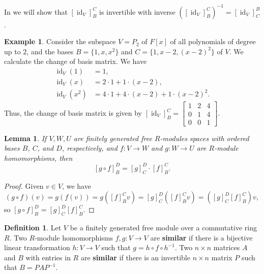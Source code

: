 \documentclass[12pt]{report}
\newtheorem{lemma}[theorem]{Lemma}
\numberwithin{equation}{section}
\numberwithin{theorem}{chapter}
\theoremstyle{definition}
\newtheorem{definition}[theorem]{Definition}
\newtheorem{example}[theorem]{Example}
\newtheorem*{basic properties}{Basic Properties}
\newtheorem*{Important Remark}{Important Remark}
\newcommand{\df}[1]{{\bf #1}\index{#1}}
\DeclareMathOperator{\id}{id}
\begin{document}
In  we will show that $[\id_V]_B^{C}$ is invertible with inverse $\left([\id_V]_B^{C}\right)^{-1}=[\id_V]_{C}^B$.

\begin{example}
Consider the subspace $V = P_2$ of $F[x]$ of all polynomials of degree up to $2$, and the bases $B = \{1, x, x^2\}$ and $C = \{1,x-2,(x-2)^2\}$ of $V$. We calculate the change of basis matrix. We have
$$\begin{aligned}
\id_V(1) &=1 ,\\
\id_V(x) &=2\cdot1+1\cdot(x-2), \\
\id_V(x^2) &=4\cdot1 +4\cdot(x-2)+1\cdot(x-2)^2.
\end{aligned}$$
Thus, the change of basis matrix is given by 
$[\id_V]_B^{C} = \begin{bmatrix}
1 & 2 & 4\\
0 & 1 & 4\\
0 & 0 & 1
\end{bmatrix}.$
\end{example}




 
\begin{lemma}\label{lem:matcompos}
 If $V,W,U$ are finitely generated free $R$-modules spaces with ordered bases $B$, $C$, and $D$, respectively, and $f\!: V \to W$ and $g\!: W \to U$ are $R$-module homomorphisms, then 
 $$[g\circ f]_B^D=[g]_C^D \cdot [f]_B^C.$$
\end{lemma}
 




\begin{proof}
Given $v \in V$, we have
$$(g \circ f)(v) = g(f(v))=g([f]_B^Cv)=[g]_C^D([f]_B^Cv)=([g]_C^D[f]_B^C)v,$$
so $[g \circ f]_B^D=[g]_C^D[f]_B^C$.
\end{proof} 


\begin{definition}
Let $V$ be a finitely generated free module over a commutative ring $R$. Two $R$-module homomorphisms $f,g: V \to V$ are \df{similar} if there is a bijective linear transformation $h: V \to V$ such that $g = h\circ f \circ h^{-1}$. Two $n \times n$ matrices $A$ and $B$ with entries in $R$ are \df{similar} if there is an invertible $n \times n$ matrix $P$ such that $B = PAP^{-1}$.
 \end{definition}
\end{document}
